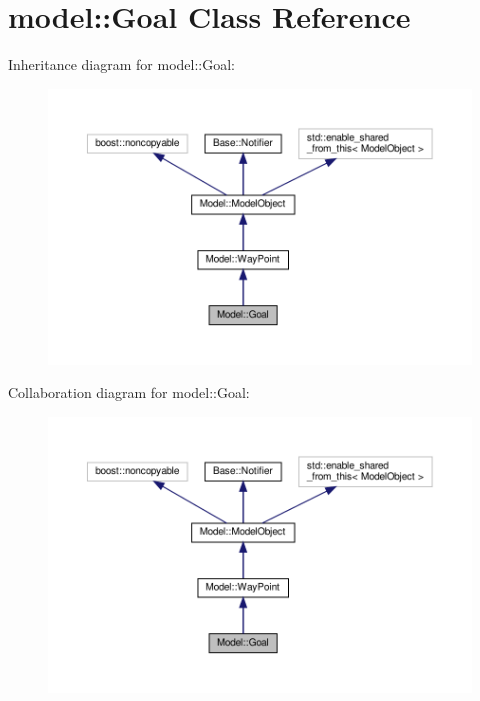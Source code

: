 \hypertarget{class_model_1_1_goal}{}\section{model\+:\+:Goal Class Reference}
\label{class_model_1_1_goal}


Inheritance diagram for model\+:\+:Goal\+:
\nopagebreak
\begin{figure}[H]
\begin{center}
\leavevmode
\includegraphics[width=350pt]{class_model_1_1_goal__inherit__graph}
\end{center}
\end{figure}


Collaboration diagram for model\+:\+:Goal\+:
\nopagebreak
\begin{figure}[H]
\begin{center}
\leavevmode
\includegraphics[width=350pt]{class_model_1_1_goal__coll__graph}
\end{center}
\end{figure}
